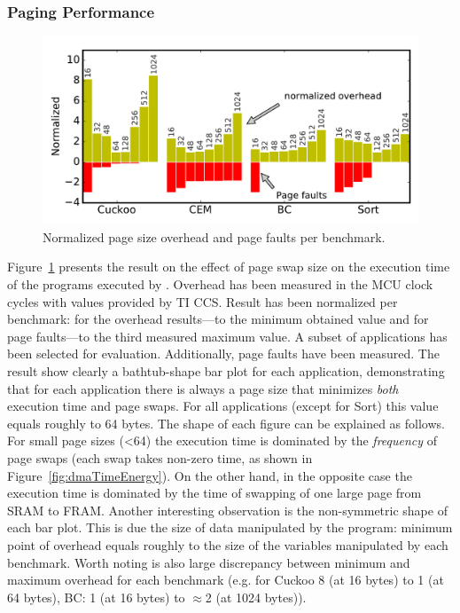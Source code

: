 \subsubsection{\sys Paging Performance}
\label{sec:results_memory_management}

\begin{figure}
	\centering
	\includegraphics[width=\columnwidth]{figures/pagSizeOverhead}
	\caption{Normalized page size overhead and page faults per benchmark.}
	\label{fig:IPOSPerformance}
	\label{fig:page_size}
\end{figure}

Figure~\ref{fig:page_size} presents the result on the effect of page swap size on the execution time of the programs executed by \sys. Overhead has been measured in the MCU clock cycles with values provided by TI CCS. Result has been normalized per benchmark: for the overhead results---to the minimum obtained value and for page faults---to the third measured maximum value. A subset of applications has been selected for evaluation. Additionally, page faults have been measured. The result show clearly a bathtub-shape bar plot for each application, demonstrating that for each application there is always a page size that minimizes \emph{both} execution time and page swaps. For all applications (except for Sort) this value equals roughly to 64 bytes. The shape of each figure can be explained as follows. For small page sizes (<64) the execution time is dominated by the \emph{frequency} of page swaps (each swap takes non-zero time, as shown in Figure~\ref{fig:dmaTimeEnergy}). On the other hand, in the opposite case the execution time is dominated by the time of swapping of one large page from SRAM to FRAM. Another interesting observation is the non-symmetric shape of each bar plot. This is due the size of data manipulated by the program: minimum point of overhead equals roughly to the size of the variables manipulated by each benchmark. Worth noting is also large discrepancy between minimum and maximum overhead for each benchmark (e.g. for Cuckoo 8 (at 16 bytes) to 1 (at 64 bytes), BC: 1 (at 16 bytes) to $\approx$2 (at 1024 bytes)).

